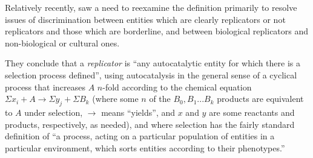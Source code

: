 %
%

Relatively recently, \textcite{Zachar2010} saw a need to reexamine the definition primarily to resolve issues of discrimination between entities which are clearly replicators or not replicators and those which are borderline, and between biological replicators and non-biological or cultural ones. 


They conclude that a \textit{replicator} is ``any autocatalytic entity for which there is a selection process defined'', using autocatalysis in the general sense of a cyclical process that increases $A$ $n$-fold according to the chemical equation $\Sigma x_i + A\rightarrow \Sigma y_j + \Sigma B_k$ (where some $n$ of the ${B_0, B_1...B_k}$ products are equivalent to $A$ under selection, $\rightarrow$ means ``yields'', and $x$ and $y$ are some reactants and products, respectively, as needed), and where selection has the fairly standard definition of ``a process, acting on a particular population of entities in a particular environment, which sorts entities according to their phenotypes.'' \parencite[p.21]{Zachar2010} 

